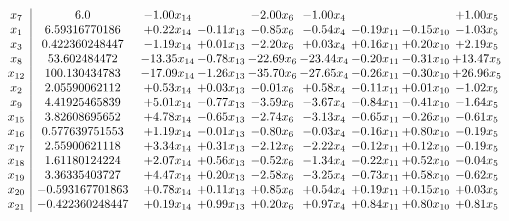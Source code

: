 \documentclass[8pt]{article}
\begin{document}
\[\begin{array}{c| c c@{\hskip 2pt} c@{\hskip 2pt} c@{\hskip 2pt} c@{\hskip 2pt} c@{\hskip 2pt} c@{\hskip 2pt} c@{\hskip 2pt} }
 x_{7}   &  6.0 & -1.00 x_{14} &   & -2.00 x_{6} & -1.00 x_{4} &    &   & +  1.00 x_{5}\\
 x_{1}   &  6.59316770186 & +  0.22 x_{14} & -0.11 x_{13} & -0.85 x_{6} & -0.54 x_{4} & -0.19 x_{11} & -0.15 x_{10} & -1.03 x_{5}\\
 x_{3}   &  0.422360248447 & -1.19 x_{14} & +  0.01 x_{13} & -2.20 x_{6} & +  0.03 x_{4} & +  0.16 x_{11} & +  0.20 x_{10} & +  2.19 x_{5}\\
 x_{8}   &  53.602484472 & -13.35 x_{14} & -0.78 x_{13} & -22.69 x_{6} & -23.44 x_{4} & -0.20 x_{11} & -0.31 x_{10} & + 13.47 x_{5}\\
 x_{12}   &  100.130434783 & -17.09 x_{14} & -1.26 x_{13} & -35.70 x_{6} & -27.65 x_{4} & -0.26 x_{11} & -0.30 x_{10} & + 26.96 x_{5}\\
 x_{2}   &  2.05590062112 & +  0.53 x_{14} & +  0.03 x_{13} & -0.01 x_{6} & +  0.58 x_{4} & -0.11 x_{11} & +  0.01 x_{10} & -1.02 x_{5}\\
 x_{9}   &  4.41925465839 & +  5.01 x_{14} & -0.77 x_{13} & -3.59 x_{6} & -3.67 x_{4} & -0.84 x_{11} & -0.41 x_{10} & -1.64 x_{5}\\
 x_{15}   &  3.82608695652 & +  4.78 x_{14} & -0.65 x_{13} & -2.74 x_{6} & -3.13 x_{4} & -0.65 x_{11} & -0.26 x_{10} & -0.61 x_{5}\\
 x_{16}   &  0.577639751553 & +  1.19 x_{14} & -0.01 x_{13} & -0.80 x_{6} & -0.03 x_{4} & -0.16 x_{11} & +  0.80 x_{10} & -0.19 x_{5}\\
 x_{17}   &  2.55900621118 & +  3.34 x_{14} & +  0.31 x_{13} & -2.12 x_{6} & -2.22 x_{4} & -0.12 x_{11} & +  0.12 x_{10} & -0.19 x_{5}\\
 x_{18}   &  1.61180124224 & +  2.07 x_{14} & +  0.56 x_{13} & -0.52 x_{6} & -1.34 x_{4} & -0.22 x_{11} & +  0.52 x_{10} & -0.04 x_{5}\\
 x_{19}   &  3.36335403727 & +  4.47 x_{14} & +  0.20 x_{13} & -2.58 x_{6} & -3.25 x_{4} & -0.73 x_{11} & +  0.58 x_{10} & -0.62 x_{5}\\
 x_{20}   &  -0.593167701863 & +  0.78 x_{14} & +  0.11 x_{13} & +  0.85 x_{6} & +  0.54 x_{4} & +  0.19 x_{11} & +  0.15 x_{10} & +  0.03 x_{5}\\
 x_{21}   &  -0.422360248447 & +  0.19 x_{14} & +  0.99 x_{13} & +  0.20 x_{6} & +  0.97 x_{4} & +  0.84 x_{11} & +  0.80 x_{10} & +  0.81 x_{5}\\

\end{array}\]
\end{document}
